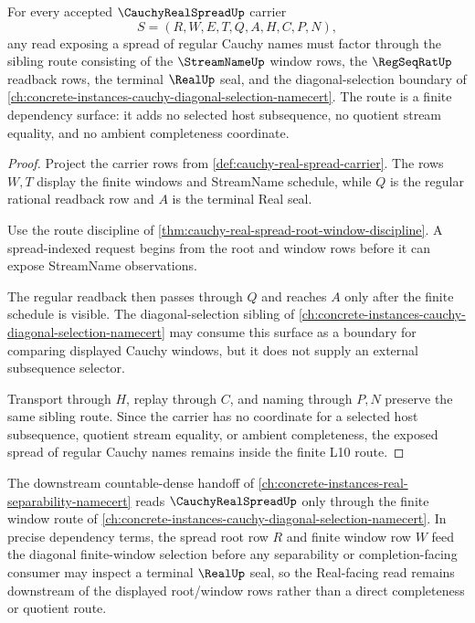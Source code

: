 \begin{theorem}
\label{thm:cauchy-real-spread-sibling-route}
For every accepted $\CauchyRealSpreadUp$ carrier
$$
S=(R,W,E,T,Q,A,H,C,P,N),
$$
any read exposing a spread of regular Cauchy names must factor through the sibling route consisting of the $\StreamNameUp$ window rows, the $\RegSeqRatUp$ readback rows, the terminal $\RealUp$ seal, and the diagonal-selection boundary of \autoref{ch:concrete-instances-cauchy-diagonal-selection-namecert}. The route is a finite dependency surface: it adds no selected host subsequence, no quotient stream equality, and no ambient completeness coordinate.
\end{theorem}
\begin{proof}
Project the carrier rows from \autoref{def:cauchy-real-spread-carrier}. The rows $W,T$ display the finite windows and StreamName schedule, while $Q$ is the regular rational readback row and $A$ is the terminal Real seal.

Use the route discipline of \autoref{thm:cauchy-real-spread-root-window-discipline}. A spread-indexed request begins from the root and window rows before it can expose StreamName observations.

The regular readback then passes through $Q$ and reaches $A$ only after the finite schedule is visible. The diagonal-selection sibling of \autoref{ch:concrete-instances-cauchy-diagonal-selection-namecert} may consume this surface as a boundary for comparing displayed Cauchy windows, but it does not supply an external subsequence selector.

Transport through $H$, replay through $C$, and naming through $P,N$ preserve the same sibling route. Since the carrier has no coordinate for a selected host subsequence, quotient stream equality, or ambient completeness, the exposed spread of regular Cauchy names remains inside the finite L10 route.
\end{proof}

The downstream countable-dense handoff of \autoref{ch:concrete-instances-real-separability-namecert} reads $\CauchyRealSpreadUp$ only through the finite window route of \autoref{ch:concrete-instances-cauchy-diagonal-selection-namecert}. In precise dependency terms, the spread root row $R$ and finite window row $W$ feed the diagonal finite-window selection before any separability or completion-facing consumer may inspect a terminal $\RealUp$ seal, so the Real-facing read remains downstream of the displayed root/window rows rather than a direct completeness or quotient route.

